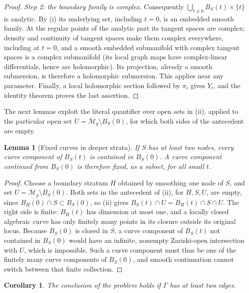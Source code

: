 \documentclass[11pt]{article}
\newcommand{\M}{\mathcal M}
\newcommand{\cl}[1]{\overline{#1}}
\newtheorem{lemma}[theorem]{Lemma}
\newtheorem{corollary}[theorem]{Corollary}
\theoremstyle{remark}
\begin{document}
\begin{proof}
\emph{Step 2: the boundary family is complex.}
Consequently \(\bigcup_{t\ne0}B_S(t)\times\{t\}\) is analytic.
By (i) its underlying set, including \(t=0\), is an embedded
smooth family. At the regular points of the analytic part its
tangent spaces are complex; density and continuity of tangent
spaces make them complex everywhere, including at \(t=0\), and
a smooth embedded submanifold with complex tangent spaces
is a complex submanifold (its local graph maps have complex-linear
differentials, hence are holomorphic).
Its projection, already a smooth submersion, is therefore
a holomorphic submersion. This applies near any parameter.
Finally, a local holomorphic section followed by \(\pi_i\) gives
\(Y_t\), and the identity theorem proves the last assertion.
\end{proof}

The next lemmas exploit the literal quantifier over open sets in
(ii), applied to the particular open set
\(U=\cl{\M}_g\setminus\cl{B_S(0)}\), for which both sides of the
antecedent are empty.

\begin{lemma}[Fixed curves in deeper strata]\label{lem:deep}
If \(S\) has at least two nodes, every curve component of \(B_S(t)\)
is contained in \(B_S(0)\). A curve component continued from
\(B_S(0)\) is therefore fixed, as a subset, for all small \(t\).
\end{lemma}

\begin{proof}
Choose a boundary stratum \(H\) obtained by smoothing one node of
\(S\), and set \(U=\cl{\M}_g\setminus\cl{B_S(0)}\).
Both sets in the antecedent of (ii), for \(H,S,U\), are empty, since
\(\cl{B_H(0)}\cap S\subset B_S(0)\), so (ii) gives
\(B_S(t)\cap U=\cl{B_H(t)}\cap S\cap U\).
The right side is finite: \(B_H(t)\) has dimension at most
one, and a locally closed algebraic curve has only finitely many
points in its closure outside its original locus.
Because \(B_S(0)\) is closed in \(S\), a curve component of \(B_S(t)\)
not contained in \(B_S(0)\) would have an infinite, nonempty
Zariski-open intersection with \(U\), which is impossible. Such a
curve component must thus be one of the finitely many curve
components of \(B_S(0)\), and smooth continuation cannot switch
between that finite collection.
\end{proof}

\begin{corollary}\label{cor:deep}
The conclusion of the problem holds if \(\Gamma\) has at least two
edges.
\end{corollary}
\end{document}
